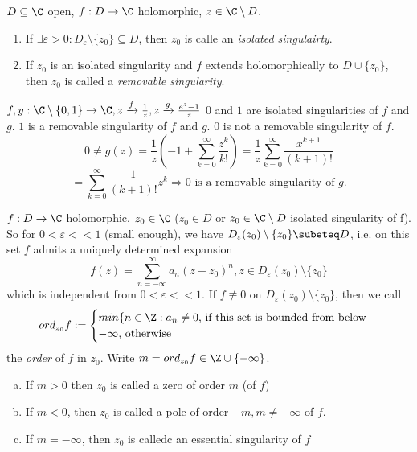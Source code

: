\begin{definition}
  $D\subseteq \C$ open, $f: D\to \C$ holomorphic, $z\in \C \setminus D$.
    \begin{enumerate}
      \item If $\exists \varepsilon >0 : D_{\varepsilon} \setminus \{z_0\} \subseteq D$, then $z_0$ is calle  an \emph{isolated singulairty}.
      \item If $z_0$ is an isolated singularity and $f$ extends holomorphically to $D\cup \{ z_0 \}$, then $z_0$ is called a \emph{removable singularity}.
    \end{enumerate}
\end{definition}

\begin{example}
  $f,y : \C\setminus\{0,1\} \to \C, z\xrightarrow{ f} \frac{1}{z}, z \xrightarrow{g} \frac{e^z-1}{z}$
  \newline $0$ and $1$ are isolated singularities of $f$ and $g$. $1$ is a removable singularity of $f$ and $g$. $0$ is not a removable singularity of $f$.
    $$0 \neq g(z)=\frac{1}{z}\left(-1 + \sum_{k=0}^{\infty}\frac{z^k}{k!} \right)= \frac{1}{z}\sum_{k=0}^{\infty} \frac{x^{k+1}}{(k+1)!}$$
    $$= \sum_{k=0}^{\infty}\frac{1}{(k+1)!}z^k \Rightarrow 0 \text{ is a removable singularity of }g.$$
\end{example}

\begin{definition}
  $f: D \to \C$ holomorphic, $z_0 \in \C$ ($z_0 \in D$ or $z_0 \in \C\setminus D$ isolated singularity of f). So for $0 < \varepsilon < < 1$ (small enough), we have $D_{\varepsilon}(z_0)\setminus \{z_0\}\subeteq D$, i.e. on this set $f$ admits a uniquely determined expansion
    $$f(z)= \sum_{n=-\infty}^{\infty}a_n(z-z_0)^n, z \in D_{\varepsilon}(z_0)\setminus\{z_0\}$$
    which is independent from $0 < \varepsilon <<1$. If $f \not\equiv 0$ on $D_{\varepsilon }(z_0)\setminus\{z_0\}$, then we call
    $$ord_{z_0}f: =
      \begin{cases}
        min\{n\in \Z : a_n \neq 0 \text{, if this set is bounded from below} \\
        - \infty \text{, otherwise}
      \end{cases}$$
    the \emph{order} of $f$ in $z_0$. Write $m=ord_{z_0}f \in \Z \cup \{ -\infty\}$.
      \begin{enumerate}[(a)]
        \item If $m>0$ then $z_0$ is called a zero of order $m$ (of $f$)
        \item If $m<0$, then $z_0$ is called a pole of order $-m, m\neq -\infty$ of $f$.
        \item If $m= - \infty$, then $z_0$ is calledc an essential singularity of $f$
      \end{enumerate}
\end{definition}

